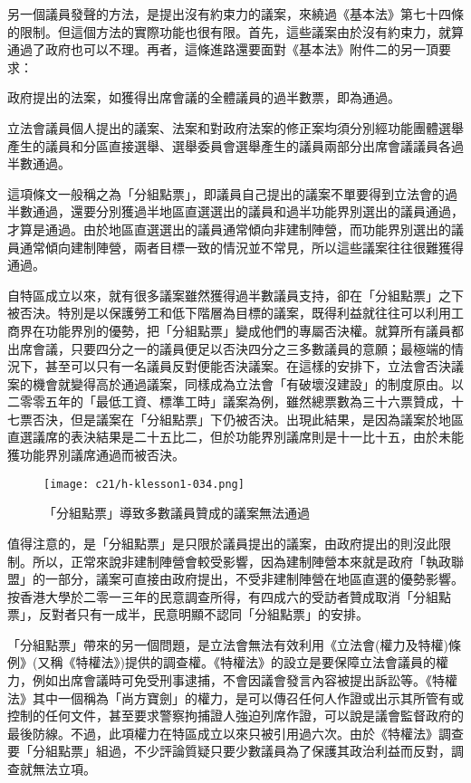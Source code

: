 另一個議員發聲的方法，是提出沒有約束力的議案，來繞過《基本法》第七十四條的限制。但這個方法的實際功能也很有限。首先，這些議案由於沒有約束力，就算通過了政府也可以不理。再者，這條進路還要面對《基本法》附件二的另一頂要求：

\begin{displayquote}
    政府提出的法案，如獲得出席會議的全體議員的過半數票，即為通過。
    
    立法會議員個人提出的議案、法案和對政府法案的修正案均須分別經功能團體選舉產生的議員和分區直接選舉、選舉委員會選舉產生的議員兩部分出席會議議員各過半數通過。
\end{displayquote}

這項條文一般稱之為「分組點票」，即議員自己提出的議案不單要得到立法會的過半數通過，還要分別獲過半地區直選選出的議員和過半功能界別選出的議員通過，才算是通過。由於地區直選選出的議員通常傾向非建制陣營，而功能界別選出的議員通常傾向建制陣營，兩者目標一致的情況並不常見，所以這些議案往往很難獲得通過。

自特區成立以來，就有很多議案雖然獲得過半數議員支持，卻在「分組點票」之下被否決。特別是以保護勞工和低下階層為目標的議案，既得利益就往往可以利用工商界在功能界別的優勢，把「分組點票」變成他們的專屬否決權。就算所有議員都出席會議，只要四分之一的議員便足以否決四分之三多數議員的意願；最極端的情況下，甚至可以只有一名議員反對便能否決議案。在這樣的安排下，立法會否決議案的機會就變得高於通過議案，同樣成為立法會「有破壞沒建設」的制度原由。以二零零五年的「最低工資、標準工時」議案為例，雖然總票數為三十六票贊成，十七票否決，但是議案在「分組點票」下仍被否決。出現此結果，是因為議案於地區直選議席的表決結果是二十五比二，但於功能界別議席則是十一比十五，由於未能獲功能界別議席通過而被否決。

\begin{figure}[htbp]
    \centering
    \texttt{[image: c21/h-klesson1-034.png]}
    \caption{「分組點票」導致多數議員贊成的議案無法通過} 
\end{figure}

值得注意的，是「分組點票」是只限於議員提出的議案，由政府提出的則沒此限制。所以，正常來說非建制陣營會較受影響，因為建制陣營本來就是政府「執政聯盟」的一部分，議案可直接由政府提出，不受非建制陣營在地區直選的優勢影響。按香港大學於二零一三年的民意調查所得，有四成六的受訪者贊成取消「分組點票」，反對者只有一成半，民意明顯不認同「分組點票」的安排。

「分組點票」帶來的另一個問題，是立法會無法有效利用《立法會(權力及特權)條例》(又稱《特權法》)提供的調查權。《特權法》的設立是要保障立法會議員的權力，例如出席會議時可免受刑事逮捕，不會因議會發言內容被提出訴訟等。《特權法》其中一個稱為「尚方寶劍」的權力，是可以傳召任何人作證或出示其所管有或控制的任何文件，甚至要求警察拘捕證人強迫列席作證，可以說是議會監督政府的最後防線。不過，此項權力在特區成立以來只被引用過六次。由於《特權法》調查要「分組點票」組過，不少評論質疑只要少數議員為了保護其政治利益而反對，調查就無法立項。


